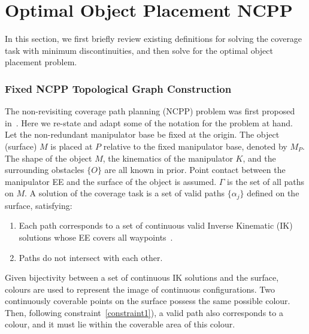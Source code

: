 \documentclass[letterpaper,journal]{IEEEtran}
\begin{document}
\section{Optimal Object Placement NCPP}
\label{sectionproblemformulation}
In this section, we first briefly review existing definitions for solving the coverage task with minimum discontinuities, and then solve for the optimal object placement problem. 
\subsubsection{Fixed NCPP Topological Graph Construction}
\label{subsection_NCPP}
The non-revisiting coverage path planning (NCPP) problem was first proposed in~\cite{Yang2020Nonrevisiting}. Here we re-state and adapt some of the notation for the problem at hand. 
Let the non-redundant manipulator base be fixed at the origin. The object (surface) $M$ is placed at $P$ relative to the fixed manipulator base, denoted by $M_P$. The shape of the object $M$, the kinematics of the manipulator $K$, and the surrounding obstacles $\{O\}$ are all known in prior. Point contact between the manipulator EE and the surface of the object is assumed. $\Gamma$ is the set of all paths on $M$. A solution of the coverage task is a set of valid paths $\{\alpha_j\}$ defined on the surface, satisfying: 
\begin{enumerate}
\item Each path corresponds to a set of continuous valid Inverse Kinematic (IK) solutions whose EE covers all waypoints~\cite{Yang2020Nonrevisiting}.  
\label{constraint1} 
\item Paths do not intersect with each other.
\end{enumerate}
Given bijectivity between a set of continuous IK solutions and the surface, colours are used to represent the image of continuous configurations.
Two continuously coverable points on the surface possess the same possible colour. 
Then, following constraint~\ref{constraint1}), a valid path also corresponds to a colour, and it must lie within the coverable area of this colour. 
\end{document}
